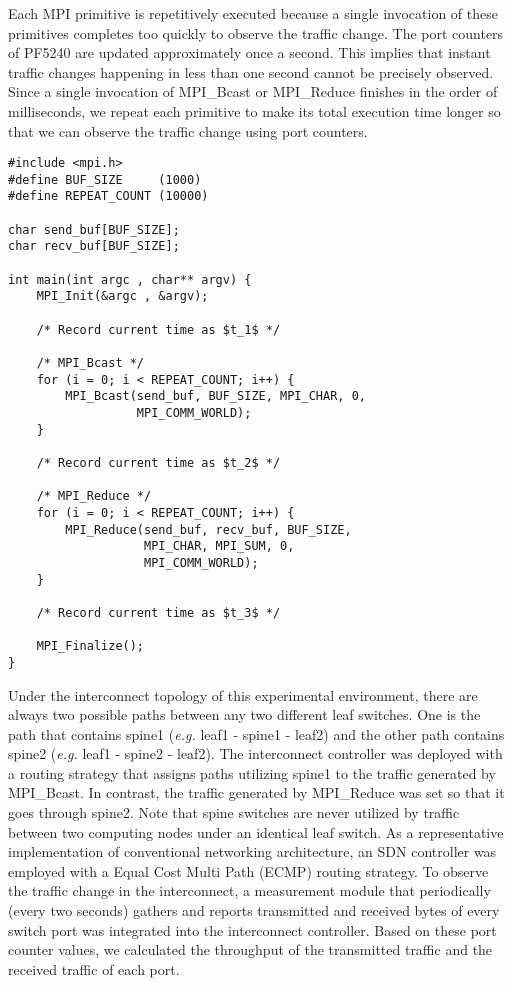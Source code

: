 Each MPI primitive is repetitively executed because a single invocation
of these primitives completes too quickly to observe the traffic change.
The port counters of PF5240 are updated approximately once a second.
This implies that instant traffic changes happening in less than one
second cannot be precisely observed. Since a single invocation of
MPI\_Bcast or MPI\_Reduce finishes in the order of milliseconds, we
repeat each primitive to make its total execution time longer so that we
can observe the traffic change using port counters.

\begin{lstlisting}[caption={Source code of MPI application}, label=lst:sync-mpi-app, float=htbp]
#include <mpi.h>
#define BUF_SIZE     (1000)
#define REPEAT_COUNT (10000)

char send_buf[BUF_SIZE];
char recv_buf[BUF_SIZE];

int main(int argc , char** argv) {
    MPI_Init(&argc , &argv);

    /* Record current time as $t_1$ */

    /* MPI_Bcast */
    for (i = 0; i < REPEAT_COUNT; i++) {
        MPI_Bcast(send_buf, BUF_SIZE, MPI_CHAR, 0,
                  MPI_COMM_WORLD);
    }

    /* Record current time as $t_2$ */

    /* MPI_Reduce */
    for (i = 0; i < REPEAT_COUNT; i++) {
        MPI_Reduce(send_buf, recv_buf, BUF_SIZE,
                   MPI_CHAR, MPI_SUM, 0,
                   MPI_COMM_WORLD);
    }

    /* Record current time as $t_3$ */

    MPI_Finalize();
}
\end{lstlisting}

Under the interconnect topology of this experimental environment, there
are always two possible paths between any two different leaf switches.
One is the path that contains spine1 (\emph{e.g.} leaf1 - spine1 -
leaf2) and the other path contains spine2 (\emph{e.g.} leaf1 - spine2 -
leaf2). The interconnect controller was deployed with a routing strategy
that assigns paths utilizing spine1 to the traffic generated by
MPI\_Bcast. In contrast, the traffic generated by MPI\_Reduce was set so
that it goes through spine2. Note that spine switches are never utilized
by traffic between two computing nodes under an identical leaf switch.
As a representative implementation of conventional networking
architecture, an SDN controller was employed with a Equal Cost Multi
Path (ECMP) routing strategy. To observe the traffic change in the
interconnect, a measurement module that periodically (every two seconds)
gathers and reports transmitted and received bytes of every switch port
was integrated into the interconnect controller. Based on these port
counter values, we calculated the throughput of the transmitted traffic
and the received traffic of each port.

